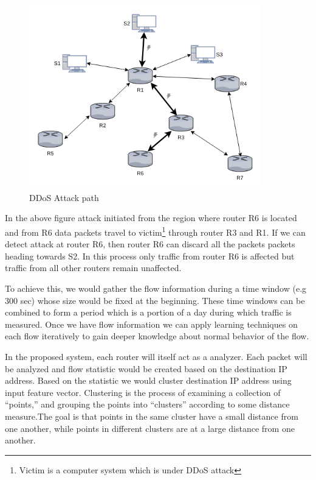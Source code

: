 \documentclass[10pt,oneside,a4paper]{article}
\begin{document}
\begin{figure}[H]
\centering
\includegraphics[width=0.90\textwidth]{RouterCommunication}
\caption{DDoS Attack path} \label{fig:attackpath}
\end{figure}


In the above figure attack initiated from the region where router R6 is located and from R6 data packets travel to victim\footnote{Victim is a computer system which is under DDoS attack} through router R3 and R1. If we can detect attack at router R6, then router R6 can discard all the packets packets heading towards S2. In this process only traffic from router R6 is affected but traffic from all other routers remain unaffected.

To achieve this, we would gather the flow information during a time window (e.g 300 sec) whose size would be fixed at the beginning.
These time windows can be combined to form a period which is a portion of a day during which traffic is measured. Once we have flow information we can apply learning techniques on each flow iteratively to gain deeper knowledge about normal behavior of the flow.\par

In the proposed system, each router will itself act as a analyzer. Each packet will be analyzed and flow statistic would be created based on the destination IP address. Based on the statistic we would cluster destination IP address using input feature vector. Clustering is the process of examining a collection of “points,” and grouping the points into “clusters” according to some distance measure.The goal is that
points in the same cluster have a small distance from one another, while points in different clusters are at a large distance from one another\cite{machineLearning}.
\end{document}
